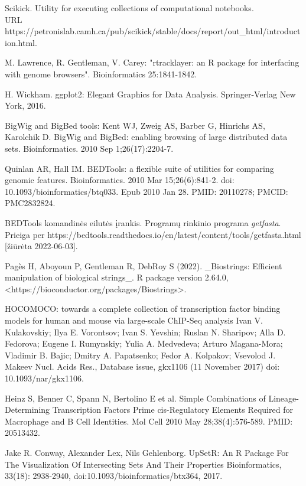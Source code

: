 \documentclass[12pt]{article}
\begin{document}
\begin{thebibliography}{99}
Scikick. Utility for executing collections of computational
notebooks.\\
URL https://petronislab.camh.ca/pub/scikick/stable/docs/report/out\_html/introduction.html.

 M. Lawrence, R. Gentleman, V. Carey: "rtracklayer: an {R}
package for interfacing with genome browsers". Bioinformatics 25:1841-1842.

 H. Wickham. ggplot2: Elegant Graphics for Data Analysis.
Springer-Verlag New York, 2016.

 BigWig and BigBed tools: Kent WJ, Zweig AS, Barber G,
Hinrichs AS, Karolchik D. BigWig and BigBed: enabling browsing of large
distributed data sets. Bioinformatics. 2010 Sep 1;26(17):2204-7.

 Quinlan AR, Hall IM. BEDTools: a flexible suite of
utilities for comparing genomic features. Bioinformatics. 2010 Mar
15;26(6):841-2. doi: 10.1093/bioinformatics/btq033. Epub 2010 Jan 28.
PMID: 20110278; PMCID: PMC2832824.

 BEDTools komandinės eilutės įrankis. Programų rinkinio
programa \emph{getfasta}.\\
Prieiga per https://bedtools.readthedocs.io/en/latest/content/tools/getfasta.html
[žiūrėta 2022-06-03].

 Pagès H, Aboyoun P, Gentleman R, DebRoy S (2022). \_Biostrings:
Efficient manipulation of biological strings\_. R package version
2.64.0, <https://bioconductor.org/packages/Biostrings>.

 HOCOMOCO: towards a complete collection of transcription
factor binding models for human and mouse via large-scale ChIP-Seq analysis
Ivan V. Kulakovskiy; Ilya E. Vorontsov; Ivan S. Yevshin; Ruslan N. Sharipov;
Alla D. Fedorova; Eugene I. Rumynskiy; Yulia A. Medvedeva; Arturo Magana-Mora;
Vladimir B. Bajic; Dmitry A. Papatsenko; Fedor A. Kolpakov; Vsevolod J. Makeev
Nucl. Acids Res., Database issue, gkx1106 (11 November 2017)
doi: 10.1093/nar/gkx1106.

 Heinz S, Benner C, Spann N, Bertolino E et al. Simple
Combinations of Lineage-Determining Transcription Factors Prime cis-Regulatory
Elements Required for Macrophage and B Cell Identities. Mol Cell 2010 May
28;38(4):576-589. PMID: 20513432.

 Jake R. Conway, Alexander Lex, Nils Gehlenborg. UpSetR: An R
Package For The Visualization Of Intersecting Sets And Their Properties
Bioinformatics, 33(18): 2938-2940, doi:10.1093/bioinformatics/btx364, 2017.


\end{thebibliography}
\end{document}
